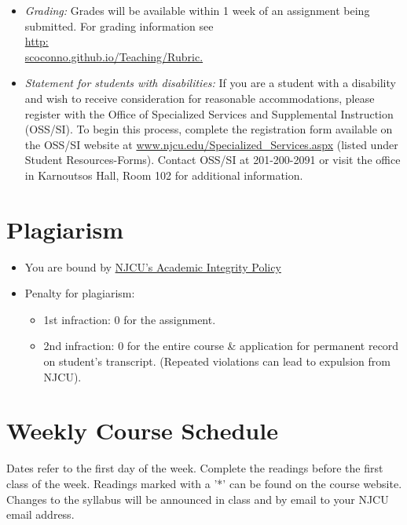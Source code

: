 \documentclass[11pt,article,oneside]{memoir}
\begin{document}
\begin{itemize}
\item \textit{Grading:} Grades will be available within 1 week of an assignment being submitted. For grading information see\\ \href{http://scoconno.github.io/Teaching/Rubric}{http:\\scoconno.github.io/Teaching/Rubric.}


\item \textit{Statement for students with disabilities:} If you are a student
with a disability and wish to receive consideration for reasonable
accommodations, please register with the Office of Specialized Services
and Supplemental Instruction (OSS/SI). To begin this process, complete
the registration form available on the OSS/SI website at
\href{http://www.njcu.edu/Specialized_Services.aspx}{www.njcu.edu/Specialized\_Services.aspx}
(listed under Student Resources-Forms). Contact OSS/SI at 201-200-2091
or visit the office in Karnoutsos Hall, Room 102 for additional
information.
\end{itemize}

\section{Plagiarism}

\begin{itemize} 
\item You are bound by \href{http://www.njcu.edu/uploadedFiles/About_NJCU/Governance_and_Organization/University_Senate/Policies/Academic\%20INTEGRITY\%20POLICY\%20FINAL\%202-04.pdf}{NJCU's Academic Integrity Policy}
\item Penalty for plagiarism:
\begin{itemize}
\item 1st infraction: 0 for the assignment. 
\item 2nd infraction: 0 for the entire course \& application for permanent record on student's transcript. (Repeated violations can lead to expulsion from NJCU). 
\end{itemize}
\end{itemize}


\section{Weekly Course Schedule}
Dates refer to the first day of the week. Complete the readings before the first class of the week. Readings marked with a '*' can be found on the course website. Changes to the syllabus will be announced in class and by email to your NJCU email address.  
\end{document}
